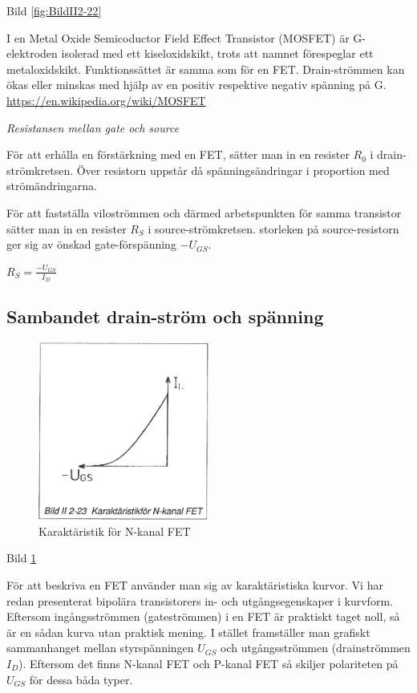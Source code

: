 Bild \ref{fig:BildII2-22}


I en Metal Oxide Semicoductor Field Effect Transistor (MOSFET) är
G-elektroden isolerad med ett kiseloxidskikt, trots att namnet förespeglar
ett metaloxidskikt. Funktionssättet är samma som för en FET.
Drain-strömmen kan ökas eller minskas med hjälp av en
positiv respektive negativ spänning på G.
\url{https://en.wikipedia.org/wiki/MOSFET}

\emph{Resistansen mellan gate och source}

För att erhålla en förstärkning med en FET, sätter man in en resister
\(R_0\) i drain-strömkretsen. Över resistorn uppstår då spänningsändringar i
proportion med strömändringarna.

För att fastställa viloströmmen och därmed arbetspunkten för samma transistor
sätter man in en resister \(R_S\) i source-strömkretsen. storleken på
source-resistorn ger sig av önskad gate-förspänning \(-U_{GS}\).

\(R_S = \frac{-U_{GS}}{I_D}\)

\subsection{Sambandet drain-ström och spänning}

\begin{figure}
\includegraphics[width=0.5\textwidth]{images/bild_2_2-23}
\caption{Karaktäristik för N-kanal FET}
\label{fig:BildII2-23}
\end{figure}

Bild \ref{fig:BildII2-23}

För att beskriva en FET använder man sig av karaktäristiska kurvor. Vi har redan
presenterat bipolära transistorers in- och utgångsegenskaper i kurvform.
Eftersom ingångsströmmen (gateströmmen) i en FET är praktiskt taget noll, så är
en sådan kurva utan praktisk mening. I stället framställer man grafiskt
sammanhanget mellan styrspänningen \(U_{GS}\) och utgångsströmmen (drainströmmen
\(I_D\)). Eftersom det finns N-kanal FET och P-kanal FET så skiljer polariteten
på \(U_{GS}\) för dessa båda typer.
